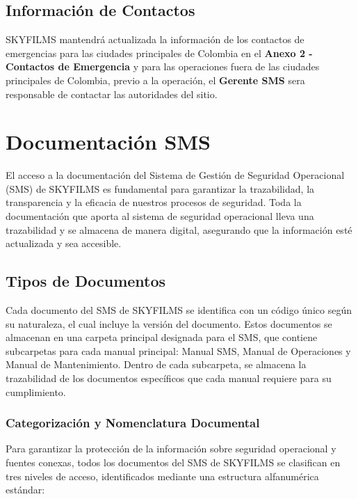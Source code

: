 \subsection{Información de Contactos}
SKYFILMS mantendrá actualizada la información de los contactos de emergencias para las ciudades principales de Colombia en el \textbf{Anexo 2 - Contactos de Emergencia} y para las operaciones fuera de las ciudades principales de Colombia, previo a la operación, el \textbf{Gerente SMS} sera responsable de contactar las autoridades del sitio.


\section{Documentación SMS}
El acceso a la documentación del Sistema de Gestión de Seguridad Operacional (SMS) de SKYFILMS es fundamental para garantizar la trazabilidad, la transparencia y la eficacia de nuestros procesos de seguridad. Toda la documentación que aporta al sistema de seguridad operacional lleva una trazabilidad y se almacena de manera digital, asegurando que la información esté actualizada y sea accesible.

\subsection{Tipos de Documentos}
Cada documento del SMS de SKYFILMS se identifica con un código único según su naturaleza, el cual incluye la versión del documento. Estos documentos se almacenan en una carpeta principal designada para el SMS, que contiene subcarpetas para cada manual principal: Manual SMS, Manual de Operaciones y Manual de Mantenimiento. Dentro de cada subcarpeta, se almacena la trazabilidad de los documentos específicos que cada manual requiere para su cumplimiento.

\subsubsection{Categorización y Nomenclatura Documental}
Para garantizar la protección de la información sobre seguridad operacional y fuentes conexas, todos los documentos del SMS de SKYFILMS se clasifican en tres niveles de acceso, identificados mediante una estructura alfanumérica estándar:\\

